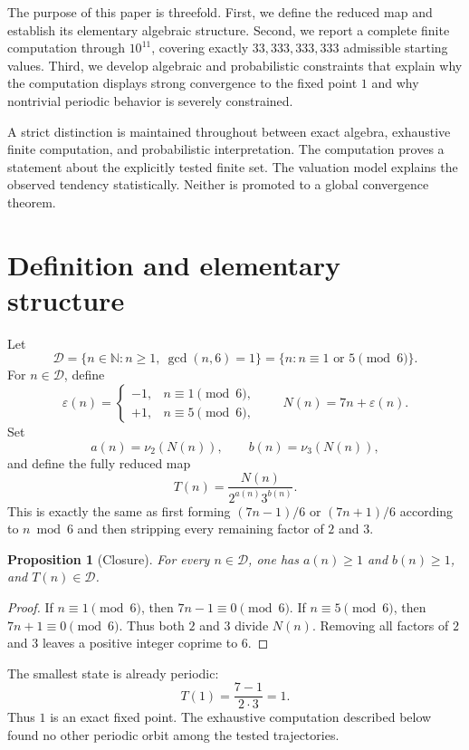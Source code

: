 \documentclass[11pt]{article}
\newtheorem{proposition}{Proposition}
\newcommand{\N}{\mathbb{N}}
\begin{document}
The purpose of this paper is threefold. First, we define the reduced map and establish its elementary algebraic structure. Second, we report a complete finite computation through $10^{11}$, covering exactly $33,333,333,333$ admissible starting values. Third, we develop algebraic and probabilistic constraints that explain why the computation displays strong convergence to the fixed point $1$ and why nontrivial periodic behavior is severely constrained.

A strict distinction is maintained throughout between exact algebra, exhaustive finite computation, and probabilistic interpretation. The computation proves a statement about the explicitly tested finite set. The valuation model explains the observed tendency statistically. Neither is promoted to a global convergence theorem.

\section{Definition and elementary structure}
Let
\[
\mathcal D=\{n\in\N:n\ge1,\ \gcd(n,6)=1\}=\{n:n\equiv1\text{ or }5\pmod6\}.
\]
For $n\in\mathcal D$, define
\[
\varepsilon(n)=\begin{cases}
-1,&n\equiv1\pmod6,\\
+1,&n\equiv5\pmod6,
\end{cases}
\qquad N(n)=7n+\varepsilon(n).
\]
Set
\[
a(n)=\nu_2(N(n)),\qquad b(n)=\nu_3(N(n)),
\]
and define the fully reduced map
\begin{equation}
T(n)=\frac{N(n)}{2^{a(n)}3^{b(n)}}.
\label{eq:T}
\end{equation}
This is exactly the same as first forming $(7n-1)/6$ or $(7n+1)/6$ according to $n\bmod6$ and then stripping every remaining factor of $2$ and $3$.

\begin{proposition}[Closure]
For every $n\in\mathcal D$, one has $a(n)\ge1$ and $b(n)\ge1$, and $T(n)\in\mathcal D$.
\end{proposition}
\begin{proof}
If $n\equiv1\pmod6$, then $7n-1\equiv0\pmod6$. If $n\equiv5\pmod6$, then $7n+1\equiv0\pmod6$. Thus both $2$ and $3$ divide $N(n)$. Removing all factors of $2$ and $3$ leaves a positive integer coprime to $6$.
\end{proof}

The smallest state is already periodic:
\[
T(1)=\frac{7-1}{2\cdot3}=1.
\]
Thus $1$ is an exact fixed point. The exhaustive computation described below found no other periodic orbit among the tested trajectories.
\end{document}

